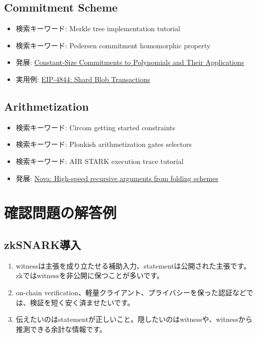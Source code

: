 \documentclass[a4paper,11pt]{ltjsarticle}
\begin{document}
\subsection{Commitment Scheme}

\begin{itemize}
  \item 検索キーワード: Merkle tree implementation tutorial
  \item 検索キーワード: Pedersen commitment homomorphic property
  \item 発展: \href{https://cacr.uwaterloo.ca/techreports/2010/cacr2010-10.pdf}{Constant-Size Commitments to Polynomials and Their Applications}
  \item 実用例: \href{https://eips.ethereum.org/EIPS/eip-4844}{EIP-4844: Shard Blob Transactions}
\end{itemize}

\subsection{Arithmetization}

\begin{itemize}
  \item 検索キーワード: Circom getting started constraints
  \item 検索キーワード: Plonkish arithmetization gates selectors
  \item 検索キーワード: AIR STARK execution trace tutorial
  \item 発展: \href{https://github.com/microsoft/Nova}{Nova: High-speed recursive arguments from folding schemes}
\end{itemize}

\section{確認問題の解答例}

\subsection{zkSNARK導入}

\begin{enumerate}
  \item witnessは主張を成り立たせる補助入力、statementは公開された主張です。zkではwitnessを非公開に保つことが多いです。
  \item on-chain verification、軽量クライアント、プライバシーを保った認証などでは、検証を短く安く済ませたいです。
  \item 伝えたいのはstatementが正しいこと。隠したいのはwitnessや、witnessから推測できる余計な情報です。
\end{enumerate}
\end{document}
